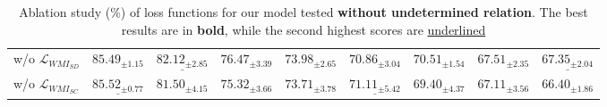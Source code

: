 \begin{table*}[ht]
\begin{adjustbox}{width=\textwidth}
\begin{tabular}{lllllllll}
\quad w/o $\mathcal{L}_{WMI_{SD}}$ & $85.49_{\pm 1.15}$ & $\underline{82.12_{\pm 2.85}}$ & $76.47_{\pm 3.39}$ & $73.98_{\pm 2.65}$ & $70.86_{\pm 3.04}$ & \underline{$70.51_{\pm 1.54}$} & $67.51_{\pm 2.35}$ & $\underline{67.35_{\pm 2.04}}$ \\

\quad w/o $\mathcal{L}_{WMI_{SC}}$ &$\underline{85.52_{\pm 0.77}}$ & $81.50_{\pm 4.15}$ & $75.32_{\pm 3.66}$ & $73.71_{\pm 3.78}$ & $\underline{71.11_{\pm 5.42}}$ & $69.40_{\pm 4.37}$ & {$67.11_{\pm 3.56}$} & {$66.40_{\pm 1.86}$} \\


\bottomrule

\end{tabular}%
\end{adjustbox}
\caption{Ablation study (\%) of loss functions for our model tested \textbf{without undetermined relation}. The best results are in \textbf{bold}, while the second highest scores are \underline{underlined}}
\label{table:ablation1}
\end{table*}


